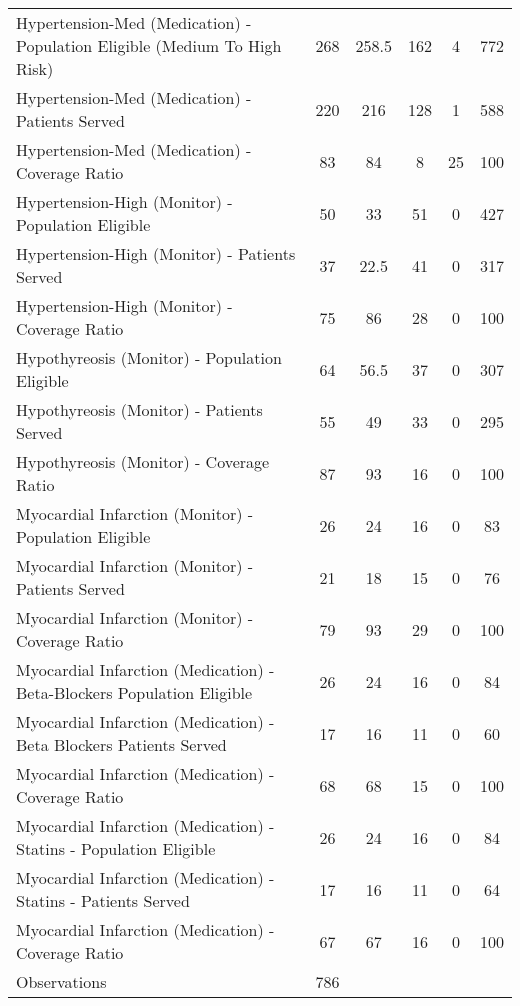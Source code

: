 {\begin{tabular}{l*{1}{ccccc}}
Hypertension-Med (Medication) - Population Eligible (Medium To High Risk)&         268&       258.5&         162&           4&         772\\
Hypertension-Med (Medication) - Patients Served&         220&         216&         128&           1&         588\\
Hypertension-Med (Medication) - Coverage Ratio&          83&          84&           8&          25&         100\\
Hypertension-High (Monitor) - Population Eligible&          50&          33&          51&           0&         427\\
Hypertension-High (Monitor) - Patients Served&          37&        22.5&          41&           0&         317\\
Hypertension-High (Monitor) - Coverage Ratio&          75&          86&          28&           0&         100\\
Hypothyreosis (Monitor) - Population Eligible&          64&        56.5&          37&           0&         307\\
Hypothyreosis (Monitor) - Patients Served&          55&          49&          33&           0&         295\\
Hypothyreosis (Monitor) - Coverage Ratio&          87&          93&          16&           0&         100\\
Myocardial Infarction (Monitor) - Population Eligible&          26&          24&          16&           0&          83\\
Myocardial Infarction (Monitor) - Patients Served&          21&          18&          15&           0&          76\\
Myocardial Infarction (Monitor) - Coverage Ratio&          79&          93&          29&           0&         100\\
Myocardial Infarction (Medication) - Beta-Blockers Population Eligible&          26&          24&          16&           0&          84\\
Myocardial Infarction (Medication) - Beta Blockers Patients Served&          17&          16&          11&           0&          60\\
Myocardial Infarction (Medication) - Coverage Ratio&          68&          68&          15&           0&         100\\
Myocardial Infarction (Medication) - Statins - Population Eligible&          26&          24&          16&           0&          84\\
Myocardial Infarction (Medication) - Statins - Patients Served&          17&          16&          11&           0&          64\\
Myocardial Infarction (Medication) - Coverage Ratio&          67&          67&          16&           0&         100\\
\hline
Observations        &         786&            &            &            &            \\
\hline\hline
\end{tabular}
}
